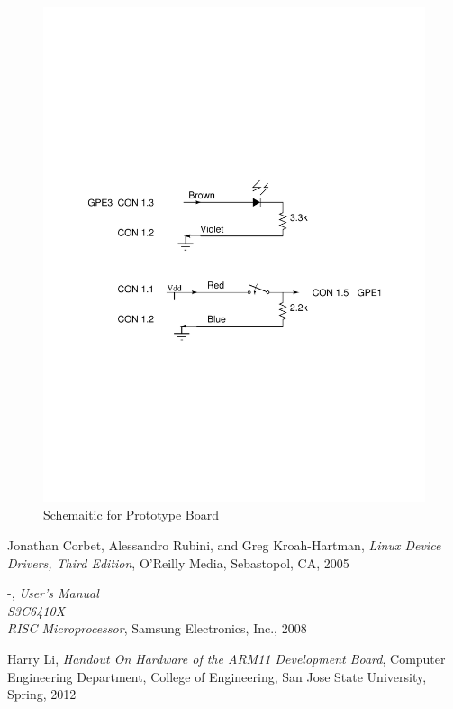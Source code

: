 \documentclass[12pt,conference]{IEEEtran}
\begin{document}
\begin{figure}[h]
	\includegraphics[scale=.55]{lab_1_proto_board}
	\caption{Schemaitic for Prototype Board}\label{lab_1_proto_board}
\end{figure}

\begin{thebibliography}{9}
Jonathan Corbet, Alessandro Rubini, and Greg Kroah-Hartman,
\emph{Linux Device Drivers, Third Edition},
O'Reilly Media,
Sebastopol, CA,
2005

-,
\emph{User's Manual \\ S3C6410X \\ RISC Microprocessor},
Samsung Electronics, Inc.,
2008

Harry Li,
\emph{Handout On Hardware of the ARM11 Development Board},
Computer Engineering Department, College of Engineering,
 San Jose State University,
Spring, 2012
\end{thebibliography}
\end{document}
